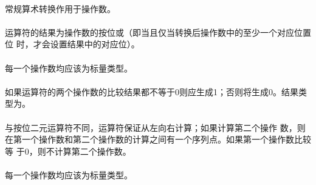 \semantic
\paragraph{}
常规算术转换作用于操作数。

\paragraph{}
运算符\tm{|}的结果为操作数的按位或（即当且仅当转换后操作数中的至少一个对应位置位
时，才会设置结果中的对应位）。

\syntax
\paragraph{}

\constraint
\paragraph{}
每一个操作数均应该为标量类型。

\semantic
\paragraph{}
如果\tm{\&\&}运算符的两个操作数的比较结果都不等于0则应生成1；否则将生成0。结果类
型为。

\paragraph{}
与按位二元\tm{\&}运算符不同，\tm{\&\&}运算符保证从左向右计算；如果计算第二个操作
数，则在第一个操作数和第二个操作数的计算之间有一个序列点。如果第一个操作数比较等
于0，则不计算第二个操作数。

\syntax
\paragraph{}

\constraint
\paragraph{}
每一个操作数均应该为标量类型。

